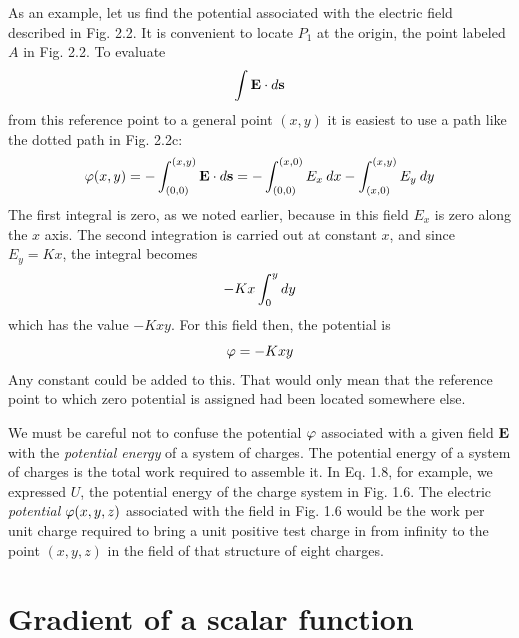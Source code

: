 As an example, let us find the potential associated with the electric
field described in Fig. 2.2. It is convenient to locate $P_1$ at the origin,
the point labeled $A$ in Fig. 2.2. To evaluate
\begin{equation}
  \int\mathbf{E}\cdot d\mathbf{s}
\end{equation}
from this reference point to a general point $(x,y)$ it is easiest to use
a path like the dotted path in Fig. 2.2c:
\begin{equation}
  \varphi(x,y) = -\int_{(0,0)}^{(x,y)}\mathbf{E}\cdot d\mathbf{s}
            = -\int_{(0,0)}^{(x,0)} E_x \: d x - \int_{(x,0)}^{(x,y)} E_y \: d y
\end{equation}
The first integral is zero, as we noted earlier, because in this field $E_x$
is zero along the $x$ axis. The second integration is carried out at constant
$x$, and since $E_y = Kx$, the integral becomes
\begin{equation}
  -Kx\int_0^y d y
\end{equation}
which has the value $-Kxy$. For this field then, the potential is
\begin{equation}
  \varphi = -Kxy
\end{equation}
Any constant could be added to this. That would only mean that the
reference point to which zero potential is assigned had been located
somewhere else.

We must be careful not to confuse the potential $\varphi$ associated with
a given field $\mathbf{E}$ with the \emph{potential energy} of a system of charges. The
potential energy of a system of charges is the total work required to
assemble it. In Eq. 1.8, for example, we expressed $U$, the potential
energy of the charge system in Fig. 1.6. The electric \emph{potential}
$\varphi(x,y,z)$ associated with the field in Fig. 1.6 would be the work per
unit charge required to bring a unit positive test charge in from infinity
to the point $(x,y,z)$ in the field of that structure of eight charges.

\section{Gradient of a scalar function}

